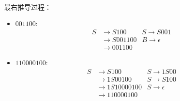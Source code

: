 \documentclass{article}
\begin{document}
\begin{enumerate}[noitemsep, label={{\arabic*}.}]
		最右推导过程：
		
		\begin{itemize}
			\item $001100$:  
			\setlength{\jot}{0pt}
			\begin{align*}
				S &\rightarrow S100    &S \to S001 \\
				  &\rightarrow S001100 &B \to \epsilon \\
				  &\rightarrow 001100  
			\end{align*}
			
			\item $110000100$: 
			\setlength{\jot}{0pt}
			\begin{align*}
				S &\rightarrow S100        &S \to 1S00\\
				  &\rightarrow 1S00100     &S \to S100\\
				  &\rightarrow 1S10000100  &S \to \epsilon\\
				  &\rightarrow 110000100 
			\end{align*}
		\end{itemize}
		
	\end{enumerate}\textbf{}
	
\end{document}
